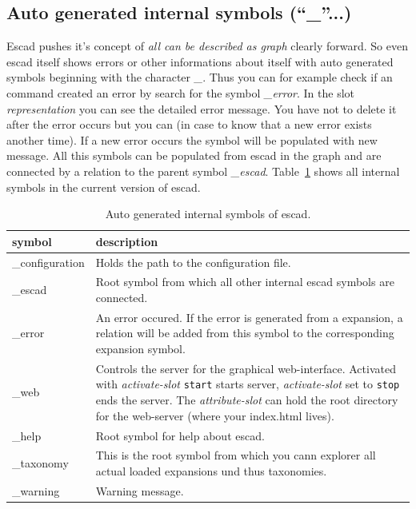 \documentclass[a4paper, 12pt, openany]{scrbook}
\begin{document}
\subsection{Auto generated internal symbols (``\_''...)}
Escad pushes it's concept of \emph{all can be described as graph} clearly forward. So even escad itself shows errors or other informations about itself with auto generated symbols beginning with the character \emph{\_}. Thus you can for example check if an command created an error by search for the symbol \emph{\_error}. In the slot \emph{representation} you can see the detailed error message. You have not to delete it after the error occurs but you can (in case to know that a new error exists another time). If a new error occurs the symbol will be populated with new message. All this symbols can be populated from escad in the graph and are connected by a relation to the parent symbol \emph{\_escad}.
Table~\ref{tab:internal-symbols} shows all internal symbols in the current version of escad.
\begin{table}[htbp]
\centering
\begin{tabular}{|p{4cm}|p{12cm}|}
  \hline
  \textbf{symbol} & \textbf{description} \\
  \hline
  \_configuration & Holds the path to the configuration file. \\
  \hline
  \_escad & Root symbol from which all other internal escad symbols are connected. \\
  \hline
  \_error & An error occured. If the error is generated from a expansion, a relation will be added from this symbol to the corresponding expansion symbol. \\
  \hline
  \_web & Controls the server for the graphical web-interface. Activated with \emph{activate-slot} \texttt{start} starts server, \emph{activate-slot} set to \texttt{stop} ends the server. The \emph{attribute-slot} can hold the root directory for the web-server (where your index.html lives). \\
  \hline
  \_help & Root symbol for help about escad. \\
  \hline
  \_taxonomy & This is the root symbol from which you cann explorer all actual loaded expansions und thus taxonomies. \\
  \hline
  \_warning & Warning message. \\
  \hline
\end{tabular}
\caption{Auto generated internal symbols of escad.}
\label{tab:internal-symbols}
\end{table}
\end{document}
